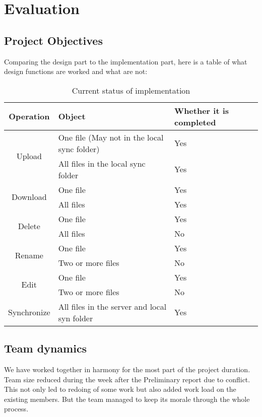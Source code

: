 \section{Evaluation}

\subsection{Project Objectives}
Comparing the design part to the implementation part, here is a table of what design functions are worked and what are not:\newline
\begin{table}[H]
\centering
\begin{tabular}{|c|p{8cm}|p{2cm}|}
\hline
Operation & Object & Whether it is completed \\
\hline
\multirow{2}{*}{Upload}&{One file (May not in the local sync folder)}&Yes\\
\cline{2-3}
&All files in the local sync folder&Yes\\
\cline{1-3}
\multirow{2}{*}{Download}&{One file}&Yes\\
\cline{2-3}
&All files&Yes\\
\cline{1-3}
\multirow{2}{*}{Delete}&{One file}&Yes\\
\cline{2-3}
&All files&No\\
\cline{1-3}
\multirow{2}{*}{Rename}&{One file}&Yes\\
\cline{2-3}
&Two or more files&No\\
\cline{1-3}
\multirow{2}{*}{Edit}&{One file}&Yes\\
\cline{2-3}
&Two or more files&No\\
\cline{1-3}
\multirow{1}{*}{Synchronize}&{All files in the server and local syn folder}&Yes\\

\bottomrule
\end{tabular}
\caption{Current status of implementation}
\end{table}

\subsection{Team dynamics}
We have worked together in harmony for the most part of the project duration. Team size reduced during the week after the Preliminary report due to conflict. This not only led to redoing of some work but also added work load on the existing members. But the team managed to keep its morale through the whole process.\newline

